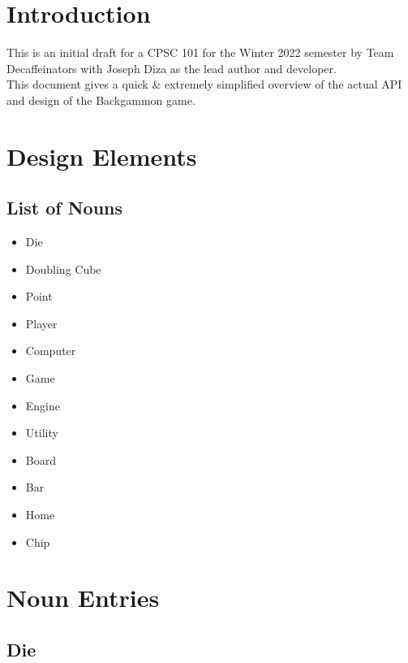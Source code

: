\documentclass{report}
\begin{document}

\tableofcontents

\chapter{Introduction}

This is an initial draft for a CPSC 101 for the Winter 2022 semester by Team Decaffeinators
with Joseph Diza as the lead author and developer.  \\

\noindent
This document gives a quick \& extremely simplified overview
of the actual API and design of the Backgammon game.

\chapter{Design Elements}

\section{List of Nouns}

\begin{multicols}{2}
    \begin{itemize}
        \item Die
        \item Doubling Cube
        \item Point
        \item Player
        \item Computer
        \item Game
    \end{itemize}

    \begin{itemize}
        \item Engine
        \item Utility
        \item Board
        \item Bar
        \item Home
        \item Chip
    \end{itemize}
\end{multicols}

\chapter{Noun Entries}

\section{Die}
\end{document}
